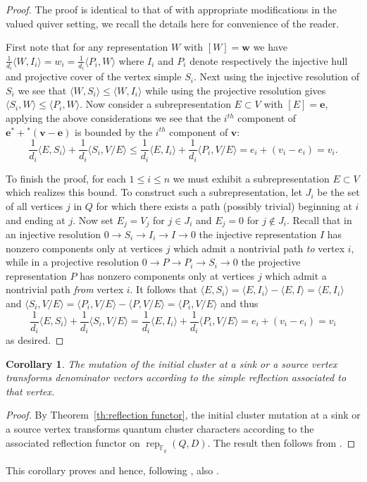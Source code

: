 \documentclass[12pt]{amsart}
\newtheorem{corollary}[theorem]{Corollary}
\newcommand{\bfe}{\mathbf{e}}
\newcommand{\bfv}{\mathbf{v}}
\newcommand{\bfw}{\mathbf{w}}
\newcommand{\FF}{\mathbb{F}}
\newcommand{\rep}{\operatorname{rep}}
\begin{document}
  \begin{proof}
    The proof is identical to that of \cite[Sec. 4, Cor. 2]{caldero-keller} with appropriate modifications in the valued quiver setting, we recall the details here for convenience of the reader.  

    First note that for any representation $W$ with $[W]=\bfw$ we have $\frac{1}{d_i}\langle W,I_i\rangle=w_i=\frac{1}{d_i}\langle P_i,W\rangle$ where $I_i$ and $P_i$ denote respectively the injective hull and projective cover of the vertex simple $S_i$.  Next using the injective resolution of $S_i$ we see that $\langle W,S_i\rangle\le\langle W,I_i\rangle$ while using the projective resolution gives $\langle S_i,W\rangle\le\langle P_i,W\rangle$.  Now consider a subrepresentation $E\subset V$ with $[E]=\bfe$, applying the above considerations we see that the $i^{th}$ component of $\bfe^*+{}^*(\bfv-\bfe)$ is bounded by the $i^{th}$ component of $\bfv$:
    \[\frac{1}{d_i}\langle E,S_i\rangle+\frac{1}{d_i}\langle S_i,V/E\rangle\le\frac{1}{d_i}\langle E,I_i\rangle+\frac{1}{d_i}\langle P_i,V/E\rangle=e_i+(v_i-e_i)=v_i.\]

    To finish the proof, for each $1\le i\le n$ we must exhibit a subrepresentation $E\subset V$ which realizes this bound.  
    To construct such a subrepresentation, let $J_i$ be the set of all vertices $j$ in $Q$ for which there exists a path (possibly trivial) beginning at $i$ and ending at $j$.  
    Now set $E_j=V_j$ for $j\in J_i$ and $E_j=0$ for $j\notin J_i$.  
    Recall that in an injective resolution $0\longrightarrow S_i\longrightarrow I_i\longrightarrow I\longrightarrow 0$ the injective representation $I$ has nonzero components only at vertices $j$ which admit a nontrivial path \emph{to} vertex $i$, while in a projective resolution $0\longrightarrow P\longrightarrow P_i\longrightarrow S_i\longrightarrow 0$ the projective representation $P$ has nonzero components only at vertices $j$ which admit a nontrivial path \emph{from} vertex $i$.  
    It follows that $\langle E,S_i\rangle=\langle E,I_i\rangle-\langle E,I\rangle=\langle E,I_i\rangle$ and $\langle S_i,V/E\rangle=\langle P_i,V/E\rangle-\langle P,V/E\rangle=\langle P_i,V/E\rangle$ and thus 
    \[\frac{1}{d_i}\langle E,S_i\rangle+\frac{1}{d_i}\langle S_i,V/E\rangle=\frac{1}{d_i}\langle E,I_i\rangle+\frac{1}{d_i}\langle P_i,V/E\rangle=e_i+(v_i-e_i)=v_i\]
    as desired.
  \end{proof}

  \begin{corollary}
    The mutation of the initial cluster at a sink or a source vertex transforms denominator vectors according to the simple reflection associated to that vertex.
  \end{corollary}
  \begin{proof}
    By Theorem~\ref{th:reflection functor}, the initial cluster mutation at a sink or a source vertex transforms quantum cluster characters according to the associated reflection functor on $\rep_{\FF_q}(Q,D)$.  The result then follows from \cite[Prop. 2.1]{dlab-ringel}.
  \end{proof}
  This corollary proves \cite[Conj. 2.8]{reading-stella} and hence, following \cite[Prop. 2.10]{reading-stella}, also \cite[Conj. 2.7]{reading-stella}.
\end{document}
